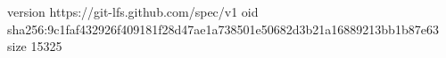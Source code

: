 version https://git-lfs.github.com/spec/v1
oid sha256:9c1faf432926f409181f28d47ae1a738501e50682d3b21a16889213bb1b87e63
size 15325
